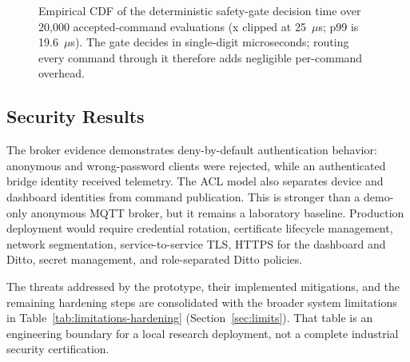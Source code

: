 \documentclass[journal]{IEEEtran}
\begin{document}
\begin{figure}[t]
\centering
{}
\caption{Empirical CDF of the deterministic safety-gate decision time over 20{,}000 accepted-command evaluations (x clipped at 25~$\mu$s; p99 is 19.6~$\mu$s). The gate decides in single-digit microseconds; routing every command through it therefore adds negligible per-command overhead.}
\label{fig:latency}
\end{figure}

\subsection{Security Results}

The broker evidence demonstrates deny-by-default authentication behavior: anonymous and wrong-password clients were rejected, while an authenticated bridge identity received telemetry. The ACL model also separates device and dashboard identities from command publication. This is stronger than a demo-only anonymous MQTT broker, but it remains a laboratory baseline. Production deployment would require credential rotation, certificate lifecycle management, network segmentation, service-to-service TLS, HTTPS for the dashboard and Ditto, secret management, and role-separated Ditto policies.

The threats addressed by the prototype, their implemented mitigations, and the remaining hardening steps are consolidated with the broader system limitations in Table~\ref{tab:limitations-hardening} (Section~\ref{sec:limits}). That table is an engineering boundary for a local research deployment, not a complete industrial security certification.
\end{document}
